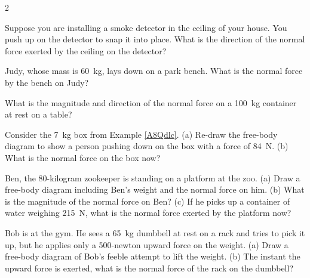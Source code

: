 \documentclass{article}
\numberwithin{equation}{section}
\numberwithin{figure}{section}
\begin{document}
\begin{multicols}{2}

\begin{exercise} \label{f03y7Z}
    Suppose you are installing a smoke detector in the ceiling of your house. You push up on the detector to snap it into place. What is the direction of the normal force exerted by the ceiling on the detector?
\end{exercise}

\begin{exercise} \label{BkOxdJ}
Judy, whose mass is \SI{60}{kg}, lays down on a park bench. What is the normal force by the bench on Judy?
\end{exercise}


\begin{exercise} \label{QaZUiq}
What is the magnitude and direction of the normal force on a \SI{100}{kg} container at rest on a table?
\end{exercise}

\begin{exercise} \label{wkga6W}
Consider the \SI{7}{kg} box from Example \ref{A8Qdlc}. (a) Re-draw the free-body diagram to show a person pushing down on the box with a force of \SI{84}{N}. (b) What is the normal force on the box now?
\end{exercise}

\begin{exercise} \label{hIgPqQ}
Ben, the 80-kilogram zookeeper is standing on a platform at the zoo. (a) Draw a free-body diagram including Ben's weight and the normal force on him. (b) What is the magnitude of the normal force on Ben? (c) If he picks up a container of water weighing \SI{215}{N}, what is the normal force exerted by the platform now? 
\end{exercise}

\begin{exercise} \label{SwLQsz}
    Bob is at the gym. He sees a \SI{65}{kg} dumbbell at rest on a rack and tries to pick it up, but he applies only a 500-newton upward force on the weight. (a) Draw a free-body diagram of Bob's feeble attempt to lift the weight. (b) The instant the upward force is exerted, what is the normal force of the rack on the dumbbell?
\end{exercise}

\end{multicols}




\end{document}
